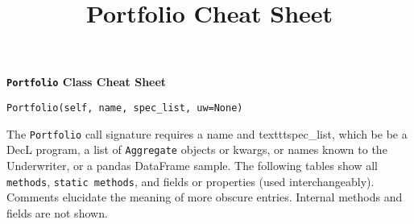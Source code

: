 %
%
%


\title{Portfolio Cheat Sheet}




{\huge{\textbf{\texttt{Portfolio} Class Cheat Sheet}}}

\raggedright
\texttt{\m Portfolio(self, name, spec\_list, uw=None)}

The \texttt{Portfolio} call signature requires a name and texttt{spec\_list}, which be be a DecL program, a list of \texttt{Aggregate} objects or kwargs, or names known to the Underwriter, or a pandas DataFrame sample.
The following tables show all \texttt{\m methods}, \texttt{\s static methods}, and fields or properties (used interchangeably). Comments elucidate the meaning of more obscure entries. Internal methods and fields are not shown.


